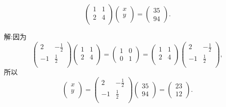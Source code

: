 \begin{frame}
\begin{example}[鸡兔同笼] \small \[\begin{pmatrix}1&1\\2&4\\\end{pmatrix}\begin{pmatrix}x\\y\\\end{pmatrix}=\begin{pmatrix}35\\94\end{pmatrix}.\]
\end{example}
\pp
解:因为
\[\begin{pmatrix}2&-\frac12\\-1&\frac12\\\end{pmatrix}\begin{pmatrix}1&1\\2&4\\\end{pmatrix}=\begin{pmatrix}1&0\\0&1\end{pmatrix}=\begin{pmatrix}1&1\\2&4\\\end{pmatrix}\begin{pmatrix}2&-\frac12\\-1&\frac12\\\end{pmatrix},\]
\pp
所以
\[\begin{pmatrix}x\\y\\\end{pmatrix}=\begin{pmatrix}2&-\frac12\\-1&\frac12\\\end{pmatrix}\begin{pmatrix}35\\94\end{pmatrix}=\begin{pmatrix}23\\12\end{pmatrix}.\]
\end{frame}





